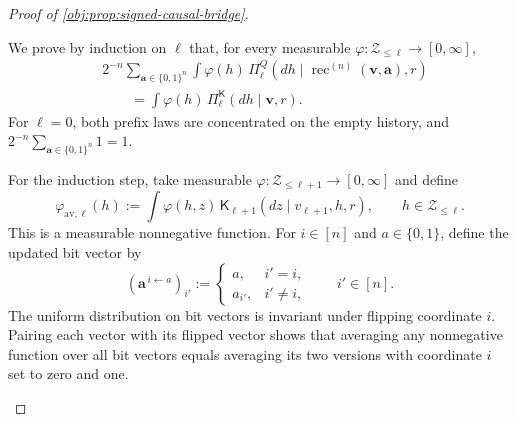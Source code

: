 \begin{proof}[Proof of \cref{obj:prop:signed-causal-bridge}]
\begin{enumerate}
We prove by induction on \(\ell\) that, for every measurable
\(\varphi:\mathcal Z_{\le\ell}\to[0,\infty]\),
\[
\begin{aligned}
&2^{-n}\sum_{\mathbf a\in\{0,1\}^n}
 \int\varphi(h)\,
 \Pi_\ell^Q(dh\mid
 \operatorname{rec}^{(n)}(\mathbf v,\mathbf a),r)\\
&\qquad=\int\varphi(h)\,
 \Pi_\ell^{\mathsf K}(dh\mid\mathbf v,r).
\end{aligned}
\]
For \(\ell=0\), both prefix laws are concentrated on the empty history,
and \(2^{-n}\sum_{\mathbf a\in\{0,1\}^n}1=1\).

For the induction step, take measurable
\(\varphi:\mathcal Z_{\le\ell+1}\to[0,\infty]\) and define
\[
\varphi_{\mathrm{av},\ell}(h)
:=\int\varphi(h,z)\,
 \mathsf K_{\ell+1}(dz\mid v_{\ell+1},h,r),
\qquad h\in\mathcal Z_{\le\ell}.
\]
This is a measurable nonnegative function. For \(i\in[n]\) and
\(a\in\{0,1\}\), define the updated bit vector by
\[
(\mathbf a^{\,i\leftarrow a})_{i'}
:=
\begin{cases}
a,&i'=i,\\
a_{i'},&i'\ne i,
\end{cases}
\qquad i'\in[n].
\]
The uniform distribution on bit vectors is invariant under flipping
coordinate \(i\). Pairing each vector with its flipped vector shows that
averaging any nonnegative function over all bit vectors equals
averaging its two versions with coordinate \(i\) set to zero and one.


\end{enumerate}
\end{proof}
